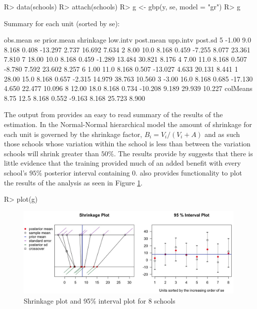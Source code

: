 \documentclass[article]{jss}
\begin{document}
\begin{CodeChunk}
\begin{CodeInput}
R> data(schools)
R> attach(schools)
R> g <- gbp(y, se, model = "gr")
R> g
\end{CodeInput}
\begin{CodeOutput}
Summary for each unit (sorted by se):

         obs.mean   se prior.mean shrinkage low.intv post.mean upp.intv post.sd
5           -1.00  9.0      8.168     0.408  -13.297     2.737   16.692   7.634
2            8.00 10.0      8.168     0.459   -7.255     8.077   23.361   7.810
7           18.00 10.0      8.168     0.459   -1.289    13.484   30.821   8.176
4            7.00 11.0      8.168     0.507   -8.780     7.592   23.602   8.257
6            1.00 11.0      8.168     0.507  -13.027     4.633   20.131   8.441
1           28.00 15.0      8.168     0.657   -2.315    14.979   38.763  10.560
3           -3.00 16.0      8.168     0.685  -17.130     4.650   22.477  10.096
8           12.00 18.0      8.168     0.734  -10.208     9.189   29.939  10.227
colMeans     8.75 12.5      8.168     0.552   -9.163     8.168   25.723   8.900
\end{CodeOutput}
\end{CodeChunk}
The output from  provides an easy to read summary of the results of the estimation. In the Normal-Normal hierarchical model the amount of shrinkage for each unit is governed by the shrinkage factor, $B_i = V_i/(V_i + A)$ and as such those schools whose variation within the school is less than between the variation schools will shrink greater than $50\%$. The results provide by  suggests that there is little evidence that the training provided much of an added benefit with every school's $95\%$ posterior interval containing 0.  also provides functionality to plot the results of the analysis as seen in Figure \ref{fig:8schoolsplot}.

\begin{CodeChunk}
\begin{CodeInput}
R> plot(g)
\end{CodeInput}
\end{CodeChunk}

\begin{figure}[h] 
\begin{center}
\includegraphics[scale=0.3]{school1.png}
\caption{Shrinkage plot and 95\% interval plot for 8 schools}
\label{fig:8schoolsplot}
\end{center}
\end{figure}
\end{document}
